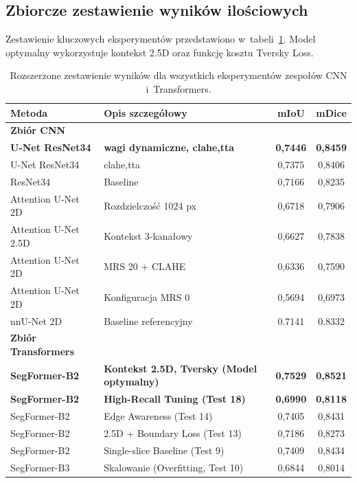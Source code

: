 \documentclass[12pt,a4paper,oneside]{report}
\begin{document}
\subsection{Zbiorcze zestawienie wyników ilościowych}
Zestawienie kluczowych eksperymentów przedstawiono w~tabeli~\ref{tab:results_all}. Model optymalny wykorzystuje kontekst 2.5D oraz funkcję kosztu Tversky Loss.
\begin{table}[htbp]
    \centering
    \small
    \caption{Rozszerzone zestawienie wyników dla wszystkich eksperymentów zespołów CNN i~Transformers.}
    \label{tab:results_all}
    \begin{tabularx}{\textwidth}{lXcc}
        \toprule
        Metoda & Opis szczegółowy & mIoU & mDice \\
        \midrule
        \textbf{Zbiór CNN} & & & \\
        \textbf{U-Net ResNet34} & \textbf{wagi dynamiczne, clahe,tta} & \textbf{0,7446} & \textbf{0,8459} \\
        U-Net ResNet34 & clahe,tta & 0,7375 & 0,8406 \\
        ResNet34 & Baseline & 0,7166 & 0,8235 \\
        Attention U-Net 2D & Rozdzielczość 1024 px & 0,6718 & 0,7906 \\
        Attention U-Net 2.5D & Kontekst 3-kanałowy & 0,6627 & 0,7838 \\
        Attention U-Net 2D & MRS 20 + CLAHE & 0,6336 & 0,7590 \\
        Attention U-Net 2D & Konfiguracja MRS 0 & 0,5694 & 0,6973 \\
        nnU-Net 2D & Baseline referencyjny & 0.7141 & 0.8332 \\
        \midrule
        \textbf{Zbiór Transformers} & & & \\
        \textbf{SegFormer-B2} & \textbf{Kontekst 2.5D, Tversky (Model optymalny)} & \textbf{0,7529} & \textbf{0,8521} \\
        \textbf{SegFormer-B2} & \textbf{High-Recall Tuning (Test 18)} & \textbf{0,6990} & \textbf{0,8118} \\
        SegFormer-B2 & Edge Awareness (Test 14) & 0,7405 & 0,8431 \\
        SegFormer-B2 & 2.5D + Boundary Loss (Test 13) & 0,7186 & 0,8273 \\
        SegFormer-B2 & Single-slice Baseline (Test 9) & 0,7409 & 0,8434 \\
        SegFormer-B3 & Skalowanie (Overfitting, Test 10) & 0,6844 & 0,8014 \\
        \bottomrule
    \end{tabularx}
\end{table}
\end{document}
